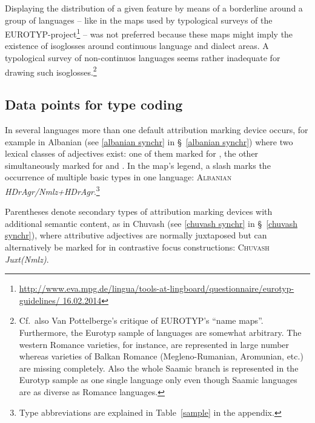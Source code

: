 Displaying the distribution of a given feature by means of a borderline around a group of languages – like in the maps used by typological surveys of the EUROTYP\hyp{}project\footnote{\url{http://www.eva.mpg.de/lingua/tools-at-lingboard/questionnaire/eurotyp-guidelines/ 16.02.2014}} – was not preferred because these maps might imply the existence of isoglosses around continuous language and dialect areas. A typological survey of non-continuos languages seems rather inadequate for drawing such isoglosses.\footnote{Cf.~also Van Pottelberge's \citeyear{van-pottelberge2001} critique of EUROTYP's “name maps”. Furthermore, the Eurotyp sample of languages are somewhat arbitrary. The western Romance varieties, for instance, are represented in large number whereas varieties of Balkan Romance (Megleno-Rumanian, Aromunian, etc.) are missing completely. Also the whole Saamic branch is represented in the Eurotyp sample as one single language only even though Saamic languages are as diverse as Romance languages.}

\subsection[Type coding]{Data points for type coding}
In several languages more than one default attribution marking device occurs, for example in Albanian (see \ref{albanian synchr} in \S~\ref{albanian synchr}) where two lexical classes of adjectives exist: one of them marked for , the other simultaneously marked for  and . In the map's legend, a slash marks the occurrence of multiple basic types in one language: \textsc{Albanian} \textit{HDrAgr/Nmlz+HDrAgr}.\footnote{Type abbreviations are explained in Table~\ref{sample} in the appendix.}

Parentheses denote secondary types of attribution marking devices with additional semantic content, as in Chuvash (see \ref{chuvash synchr} in \S~\ref{chuvash synchr}), where attributive adjectives are normally juxtaposed but can alternatively be marked for  in contrastive focus constructions: \textsc{Chuvash} \textit{Juxt(Nmlz)}.

